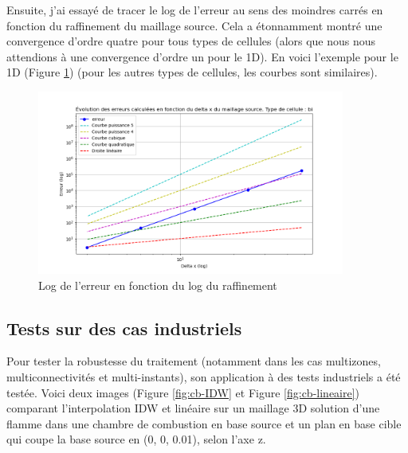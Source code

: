 Ensuite, j'ai essayé de tracer le log de l'erreur au sens des moindres carrés en fonction du raffinement du maillage source. Cela a étonnamment montré une convergence d'ordre quatre pour tous types de cellules (alors que nous nous attendions à une convergence d'ordre un pour le 1D). En voici l'exemple pour le 1D (Figure \ref{fig:bi}) (pour les autres types de cellules, les courbes sont similaires).
\begin{figure}[H]
    \centering
    \includegraphics[width=0.90\textwidth]{images/err_puissance2_bi.png}
    \caption{Log de l'erreur en fonction du log du raffinement}
    \label{fig:bi}
\end{figure}


\subsection{Tests sur des cas industriels}

Pour tester la robustesse du traitement (notamment dans les cas multizones, multiconnectivités et multi-instants), son application à des tests industriels a été testée.
Voici deux images (Figure \ref{fig:cb-IDW} et Figure \ref{fig:cb-lineaire}) comparant l'interpolation IDW et linéaire sur un maillage 3D solution d'une flamme dans une chambre de combustion en base source et un plan en base cible qui coupe la base source en (0, 0, 0.01), selon l'axe z.

